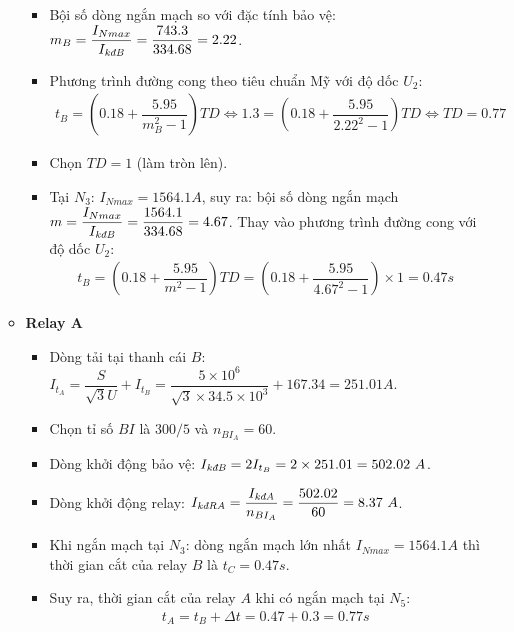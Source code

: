 \documentclass[12pt,a4paper]{article}
\begin{document}
\begin{enumerate}[1.]
\begin{itemize}
\begin{itemize}
							\item Bội số dòng ngắn mạch so với đặc tính bảo vệ: $m_B = \dfrac{I_{Nmax}}{I_{\text{\textit{kđB}}}} = \dfrac{743.3}{334.68} = 2.22$.
							
							\item Phương trình đường cong theo tiêu chuẩn Mỹ với độ dốc $U_2$:
								\begin{align*}
									t_B = \left({0.18 + \dfrac{5.95}{m_B^2 - 1}}\right)TD	\Longleftrightarrow 1.3 = \left({0.18 + \dfrac{5.95}{2.22^2 - 1}}\right)TD \Longleftrightarrow TD = 0.77
								\end{align*}
								
							\item Chọn $TD = 1$ (làm tròn lên).
							
							\item Tại $N_3$: $I_{Nmax} =1564.1 \unit{A}$, suy ra: bội số dòng ngắn mạch $m = \dfrac{I_{Nmax}}{I_{\text{\textit{kđB}}}} = \dfrac{1564.1}{334.68} = 4.67$. Thay vào phương trình đường cong với độ dốc $U_2$:
								\begin{align*}
									t_B = \left({0.18 + \dfrac{5.95}{m^2 - 1}}\right)TD = \left({0.18 + \dfrac{5.95}{4.67^2 - 1}}\right) \times 1  = 0.47 \unit{s}
								\end{align*}								
						\end{itemize}
						
					\item \textbf{Relay A}
						\begin{itemize}
							\item Dòng tải tại thanh cái $B$: $I_{t_A} = \dfrac{S}{\sqrt{3} U} + I_{t_B}= \dfrac{5 \times 10^6}{\sqrt{3} \times 34.5 \times 10^3} + 167.34 = 251.01 \unit{A}$.
							
							\item Chọn tỉ số $BI$ là $300/5$ và $n_{BI_A} = 60$.
							
							\item Dòng khởi động bảo vệ: $I_{\text{\textit{kđB}}} = 2 I_{t_B} = 2 \times 251.01 = 502.02 ~A$.
							
							\item Dòng khởi động relay: $I_{\text{\textit{kđRA}}} = \dfrac{I_{\text{\textit{kđA}}}}{n_{BI_A}} = \dfrac{502.02}{60} = 8.37 ~A$.
							
							\item Khi ngắn mạch tại $N_3$: dòng ngắn mạch lớn nhất $I_{Nmax} = 1564.1 \unit{A}$ thì thời gian cắt của relay $B$ là $t_C = 0.47 \unit{s}$.
							
							\item Suy ra, thời gian cắt của relay $A$ khi có ngắn mạch tại $N_5$:
								\begin{align*}
									t_A = t_{B} + \Delta t = 0.47 + 0.3 = 0.77 \unit{s}
								\end{align*}
								

\end{itemize}
\end{itemize}
\end{enumerate}
\end{document}
